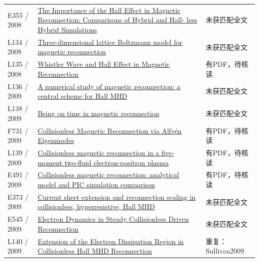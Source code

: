 \begin{longtable}{P{24mm}P{97mm}P{27mm}}
E355 / 2008 & \href{http://ui.adsabs.harvard.edu/abs/2008AGUSMSM24A..07M/abstract}{The Importance of the Hall Effect in Magnetic Reconnection: Comparisons of Hybrid and Hall- less Hybrid Simulations} & 未获匹配全文\\

L134 / 2008 & \href{https://doi.org/10.1103/physreve.77.026713}{Three-dimensional lattice Boltzmann model for magnetic reconnection} & 未获匹配全文\\

L135 / 2008 & \href{https://doi.org/10.11728/cjss2008.02.114}{Whistler Wave and Hall Effect in Magnetic Reconnection} & 有PDF，待核读\\

L136 / 2009 & \href{https://doi.org/10.1090/psapm/067.2/2605283}{A numerical study of magnetic reconnection: a central scheme for Hall MHD} & 未获匹配全文\\

L138 / 2009 & \href{https://doi.org/10.1088/1367-2630/11/6/063008}{Being on time in magnetic reconnection} & 未获匹配全文\\

F731 / 2009 & \href{https://doi.org/10.1103/physrevlett.102.245003}{Collisionless Magnetic Reconnection via Alfvén Eigenmodes} & 有PDF，待核读\\

L139 / 2009 & \href{https://doi.org/10.1090/psapm/067.2/2605264}{Collisionless magnetic reconnection in a five-moment two-fluid electron-positron plasma} & 有PDF，待核读\\

E491 / 2009 & \href{https://doi.org/10.5194/angeo-27-905-2009}{Collisionless magnetic reconnection: analytical model and PIC simulation comparison} & 有PDF，待核读\\

E373 / 2009 & \href{http://absimage.aps.org/image/DPP09/MWS_DPP09-2009-001646.pdf}{Current sheet extension and reconnection scaling in collisionless,  hyperresistive,  Hall MHD} & 未获匹配全文\\

E545 / 2009 & \href{http://id.nii.ac.jp/1013/00001414/}{Electron Dynamics in Steady Collisionless Driven Reconnection} & 未获匹配全文\\

L140 / 2009 & \href{https://doi.org/10.48550/arxiv.0905.4765}{Extension of the Electron Dissipation Region in Collisionless Hall MHD Reconnection} & 重复：Sullivan2009\\


\end{longtable}
